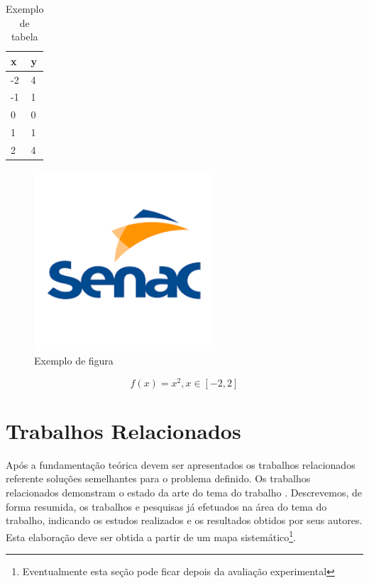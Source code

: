 \documentclass[12pt]{tcc}
\begin{document}
\begin{table}[!ht]
	\centering
	\caption{Exemplo de tabela}
	\begin{tabular}{L{1.5cm} R{1.5cm}}
		\toprule
		\textbf{x}  & \textbf{y} \\
		  & 4 \\
		-1  & 1 \\
		0  & 0 \\
		1  & 1 \\
		2  & 4 \\
		\bottomrule
	\end{tabular}
	\label{tab:exemplo}
\end{table}

\begin{figure}[!ht]
	\centering
	\includegraphics[width=0.6\textwidth]{figures/figura.png}
	\caption{Exemplo de figura}
	\label{fig:exemplo}
\end{figure}	

\begin{equation}
	\label{eq:exemplo}
	f(x) = x^2, x \in [-2,2]
\end{equation}

\chapter{Trabalhos Relacionados}
\label{sec:trabalhos_relacionados}
	\label{sec:trab_relacionados}

Após a fundamentação teórica devem ser apresentados os trabalhos relacionados referente soluções semelhantes para o problema definido. Os trabalhos relacionados demonstram o estado da arte do tema do trabalho \citep{wazlawick_metodologia_2017}. Descrevemos, de forma resumida, os trabalhos e pesquisas já efetuados na área do tema do trabalho, indicando os estudos realizados e os resultados obtidos por seus autores. Esta elaboração deve ser obtida a partir de um mapa sistemático\footnote{Eventualmente esta seção pode ficar depois da avaliação experimental}. 
\end{document}
